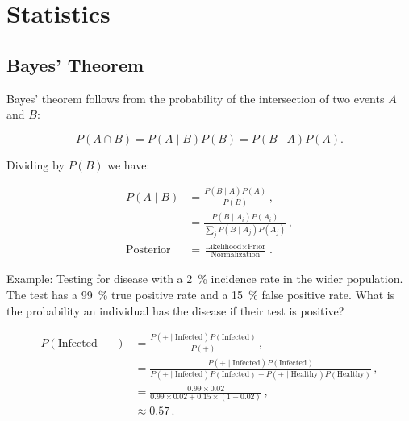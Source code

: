 \chapter{Statistics}
\label{chap:stats}

\section{Bayes' Theorem}
\label{stats:Bayes}

Bayes' theorem follows from the probability of the intersection of two events $A$ and $B$:

\begin{equation}\label{eq:stats:intersection}
P\left(A \cap B\right) = P\left(A \mid B\right) P\left(B\right) = P\left(B \mid A\right) P\left(A\right).
\end{equation}

\noindent Dividing by $P\left(B\right)$ we have:

\begin{equation}\label{eq:stats:Bayes}
\begin{split}
P\left(A \mid B\right) &= \frac{P\left(B \mid A\right) P\left(A\right)}{P\left(B\right)}\,, \\
&= \frac{P\left(B \mid A_{i}\right) P\left(A_{i}\right)}{\sum_{j} P\left(B \mid A_{j}\right)P\left(A_{j}\right)}\,, \\
\text{Posterior} &= \frac{\text{Likelihood} \times \text{Prior}}{\text{Normalization}}\,.
\end{split}
\end{equation}

Example: Testing for disease with a \SI{2}{\percent} incidence rate in the wider population.
The test has a \SI{99}{\percent} true positive rate and a \SI{15}{\percent} false positive rate.
What is the probability an individual has the disease if their test is positive?

\begin{equation}\label{eq:stats:BayesEx}
\begin{split}
P\left(\text{Infected} \mid +\right) &= \frac{P\left(+ \mid \text{Infected}\right) P\left(\text{Infected}\right)}{P\left(+\right)}\,, \\
 &= \frac{P\left(+ \mid \text{Infected}\right) P\left(\text{Infected}\right)}{
P\left(+ \mid \text{Infected}\right)P\left(\text{Infected}\right) + P\left(+ \mid \text{Healthy}\right)P\left(\text{Healthy}\right)}\,, \\
&= \frac{\num{0.99} \times \num{0.02}}{\num{0.99} \times \num{0.02} + \num{0.15} \times \left(1-\num{0.02}\right)}\,, \\
&\approx \num{0.57}\,.
\end{split}
\end{equation}

